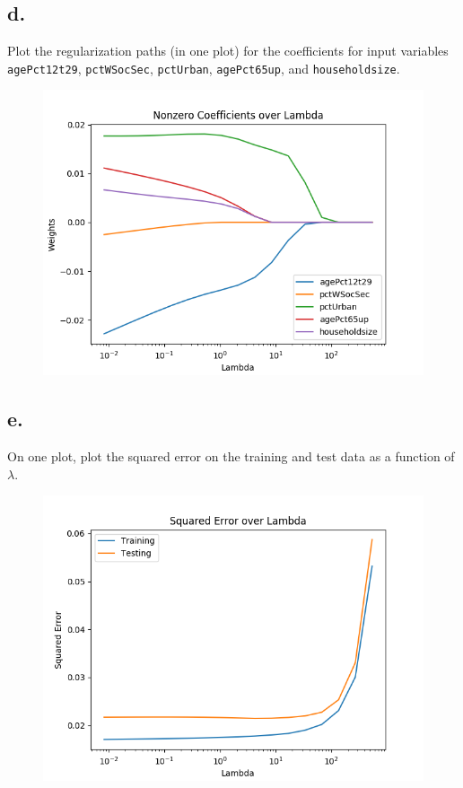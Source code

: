 \documentclass{article}
\newcommand{\1}{\mathbf{1}}
\begin{document}
{\subsection*{d.}

Plot the regularization paths (in one plot) for the coefficients for input variables \texttt{agePct12t29}, \texttt{pctWSocSec}, \texttt{pctUrban}, \texttt{agePct65up}, and \texttt{householdsize}.

\begin{figure}[ht!]
  \centering
  \includegraphics[width=150mm]{../hw2-code/results/a5_d.png}
\end{figure}

\subsection*{e.}

On one plot, plot the squared error on the training and test data as a function of $\lambda$.

\begin{figure}[ht!]
  \centering
  \includegraphics[width=150mm]{../hw2-code/results/a5_e.png}
\end{figure}

}
\end{document}

